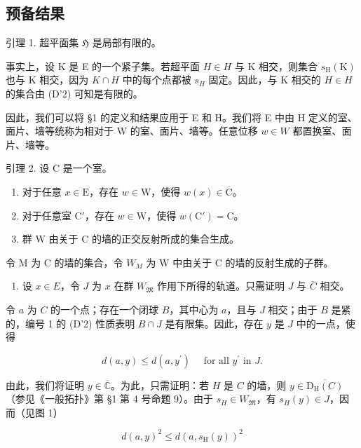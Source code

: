 \subsection{预备结果}

引理 1. 超平面集 \(\mathfrak{H}\) 是局部有限的。

事实上，设 K 是 E 的一个紧子集。若超平面 \(H \in H\) 与 K 相交，则集合 \(s_{\mathrm{H}}(\mathrm{K})\) 也与 K 相交，因为 \(K \cap H\) 中的每个点都被 \(s_{H}\) 固定。因此，与 K 相交的 \(H \in H\) 的集合由 (D'2) 可知是有限的。

因此，我们可以将 §1 的定义和结果应用于 E 和 H。我们将 E 中由 H 定义的室、面片、墙等统称为相对于 W 的室、面片、墙等。任意位移 \(w \in W\) 都置换室、面片、墙等。

引理 2. 设 C 是一个室。

\begin{enumerate}
\def\labelenumi{(\roman{enumi})}
\item
对于任意 \(x \in \mathrm{E}\)，存在 \(w \in \mathrm{W}\)，使得 \(w(x) \in \overline{\mathrm{C}}\)。
\item
对于任意室 \(\mathrm{C}'\)，存在 \(w \in \mathrm{W}\)，使得 \(w(\mathrm{C}') = \mathrm{C}\)。
\item
群 W 由关于 C 的墙的正交反射所成的集合生成。
\end{enumerate}

令 M 为 C 的墙的集合，令 \(W_{M}\) 为 W 中由关于 C 的墙的反射生成的子群。

\begin{enumerate}
\def\labelenumi{(\roman{enumi})}
\tightlist
\item
设 \(x \in E\)，令 \(J\) 为 \(x\) 在群 \(W_{\mathfrak{M}}\) 作用下所得的轨道。只需证明 \(J\) 与 \(\overline{C}\) 相交。
\end{enumerate}

令 \(a\) 为 \(C\) 的一个点；存在一个闭球 \(B\)，其中心为 \(a\)，且与 \(J\) 相交；由于 \(B\) 是紧的，编号 1 的 (D'2) 性质表明 \(B \cap J\) 是有限集。因此，存在 \(y\) 是 \(J\) 中的一点，使得

\[
d (a, y) \leqslant d (a, y ^ {\prime}) \quad \text { for   all } y ^ {\prime} \text { in } J.\tag{1}
\]

由此，我们将证明 \(y \in \overline{\mathbb{C}}\)。为此，只需证明：若 \(H\) 是 \(C\) 的墙，则 \(y \in \overline{\mathrm{D}_{\mathrm{H}}(C)}\)（参见《一般拓扑》第 §1 第 4 号命题 9）。由于 \(s_H \in W_{\mathfrak{M}}\)，有 \(s_H(y) \in J\)，因而（见图 1）

\[
d (a, y) ^ {2} \leqslant d (a, s _ {\mathrm{H}} (y)) ^ {2}\tag{2}
\]

